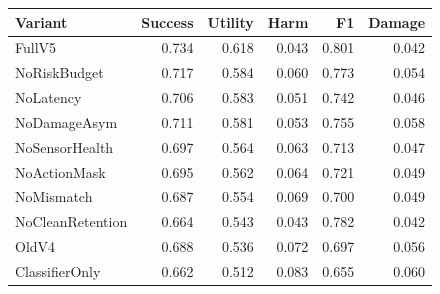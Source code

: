 \begin{tabular}{lrrrrr}
\toprule
Variant & Success & Utility & Harm & F1 & Damage \\
\midrule
FullV5 & 0.734 & 0.618 & 0.043 & 0.801 & 0.042 \\
NoRiskBudget & 0.717 & 0.584 & 0.060 & 0.773 & 0.054 \\
NoLatency & 0.706 & 0.583 & 0.051 & 0.742 & 0.046 \\
NoDamageAsym & 0.711 & 0.581 & 0.053 & 0.755 & 0.058 \\
NoSensorHealth & 0.697 & 0.564 & 0.063 & 0.713 & 0.047 \\
NoActionMask & 0.695 & 0.562 & 0.064 & 0.721 & 0.049 \\
NoMismatch & 0.687 & 0.554 & 0.069 & 0.700 & 0.049 \\
NoCleanRetention & 0.664 & 0.543 & 0.043 & 0.782 & 0.042 \\
OldV4 & 0.688 & 0.536 & 0.072 & 0.697 & 0.056 \\
ClassifierOnly & 0.662 & 0.512 & 0.083 & 0.655 & 0.060 \\
\bottomrule
\end{tabular}